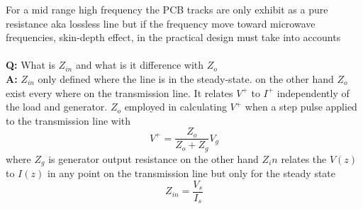 For a mid range high frequency the PCB tracks are only exhibit as a pure resistance aka lossless line but if the frequency move toward microwave frequencies, skin-depth effect, in the practical design must take into accounts
\\\\\textbf{Q:} What is $Z_{in}$ and what is it difference with $Z_o$\\
\textbf{A:} $Z_{in}$ only defined where the line is in the steady-state. on the other hand $Z_o$ exist every where on the transmission line. It relates $V^+$ to $I^+$ independently of the load and generator. $Z_o$ employed in calculating $V^+$ when a step pulse applied to the transmission line with\\
$$ V^+ = \frac{Z_o}{Z_o + Z_g} V_g $$
where $Z_g$ is generator output resistance
on the other hand $Z_in$ relates the $V(z)$ to $I(z)$ in any point on the transmission line but only for the steady state\\
$$ Z_{in} = \frac{V_s}{I_s} $$
